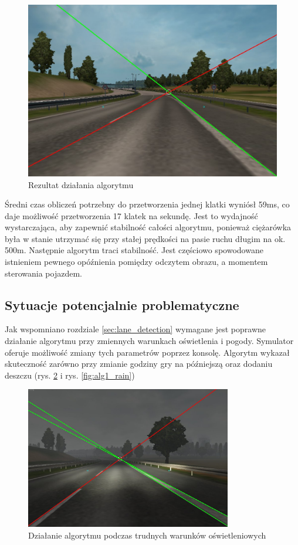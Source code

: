 \begin{figure}
  \centering
  \includegraphics[width=13cm]{img/alg1_res.jpg}
  \caption{Rezultat działania algorytmu}
  \label{fig:alg1_res}
\end{figure}

Średni czas obliczeń potrzebny do przetworzenia jednej klatki wyniósł 59ms, co daje możliwość przetworzenia 17 klatek na sekundę. 
Jest to wydajność wystarczająca, aby zapewnić stabilność całości algorytmu, ponieważ ciężarówka była w stanie utrzymać się przy stałej prędkości na pasie ruchu długim na ok. 500m. 
Następnie algorytm traci stabilność. Jest częściowo spowodowane istnieniem pewnego opóźnienia pomiędzy odczytem obrazu, a momentem sterowania pojazdem.

\subsection{Sytuacje potencjalnie problematyczne}

Jak wspomniano rozdziale \ref{sec:lane_detection} wymagane jest poprawne działanie algorytmu przy zmiennych warunkach oświetlenia i pogody. 
Symulator oferuje możliwość zmiany tych parametrów poprzez konsolę. 
Algorytm wykazał skuteczność zarówno przy zmianie godziny gry na późniejszą oraz dodaniu deszczu (rys. \ref{fig:alg1_late} i rys. \ref{fig:alg1_rain})

\begin{figure}
  \centering
  \includegraphics[width=9cm]{img/alg1_late.jpg}
  \caption{Działanie algorytmu podczas trudnych warunków oświetleniowych}
  \label{fig:alg1_late}
\end{figure}

